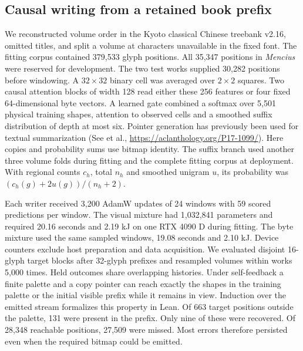 \subsection*{Causal writing from a retained book prefix}
We reconstructed volume order in the Kyoto classical Chinese treebank v2.16, omitted titles, and split a volume at characters unavailable in the fixed font. The fitting corpus contained 379,533 glyph positions. All 35,347 positions in \emph{Mencius} were reserved for development. The two test works supplied 30,282 positions before windowing. A $32\times32$ binary cell was averaged over $2\times2$ squares. Two causal attention blocks of width 128 read either these 256 features or four fixed 64-dimensional byte vectors. A learned gate combined a softmax over 5,501 physical training shapes, attention to observed cells and a smoothed suffix distribution of depth at most six. Pointer generation has previously been used for textual summarization (See et al., \url{https://aclanthology.org/P17-1099/}). Here copies and probability sums use bitmap identity. The suffix branch used another three volume folds during fitting and the complete fitting corpus at deployment. With regional counts $c_h$, total $n_h$ and smoothed unigram $u$, its probability was $(c_h(g)+2u(g))/(n_h+2)$.

Each writer received 3,200 AdamW updates of 24 windows with 59 scored predictions per window. The visual mixture had 1,032,841 parameters and required 20.16 seconds and 2.19 kJ on one RTX 4090 D during fitting. The byte mixture used the same sampled windows, 19.08 seconds and 2.10 kJ. Device counters exclude host preparation and data acquisition. We evaluated disjoint 16-glyph target blocks after 32-glyph prefixes and resampled volumes within works 5,000 times. Held outcomes share overlapping histories. Under self-feedback a finite palette and a copy pointer can reach exactly the shapes in the training palette or the initial visible prefix while it remains in view. Induction over the emitted stream formalizes this property in Lean. Of 663 target positions outside the palette, 131 were present in the prefix. Only nine of these were recovered. Of 28,348 reachable positions, 27,509 were missed. Most errors therefore persisted even when the required bitmap could be emitted.
